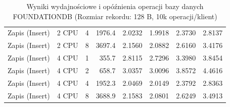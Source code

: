 \begin{table}[ht]
{\begin{tabular}{llcrrrrr}
Zapis (Insert) & 2 CPU & 4 & 1976.4 & 2.0232 & 1.9918 & 2.3730 & 2.8137 \\
Zapis (Insert) & 2 CPU & 8 & 3697.4 & 2.1560 & 2.0882 & 2.6160 & 3.4176 \\
Zapis (Insert) & 4 CPU & 1 & 355.7 & 2.8115 & 2.7296 & 3.3980 & 3.8454 \\
Zapis (Insert) & 4 CPU & 2 & 658.7 & 3.0357 & 3.0096 & 3.8572 & 4.4616 \\
Zapis (Insert) & 4 CPU & 4 & 1952.3 & 2.0469 & 2.0149 & 2.3792 & 2.8363 \\
Zapis (Insert) & 4 CPU & 8 & 3688.9 & 2.1583 & 2.0801 & 2.6249 & 3.4913 \\
\bottomrule
\end{tabular}%
}
\caption{Wyniki wydajnościowe i opóźnienia operacji bazy danych FOUNDATIONDB (Rozmiar rekordu: 128 B, 10k operacji/klient)}
\label{tab:latency_foundationdb_small_10000}
\end{table}
